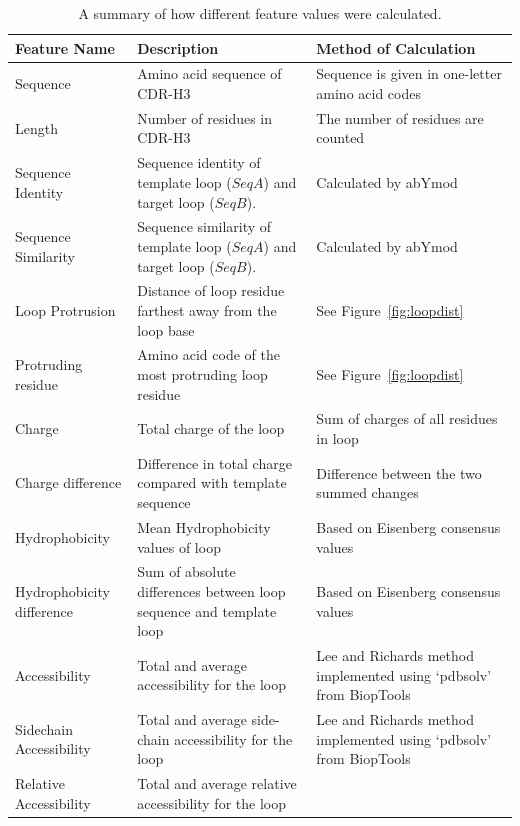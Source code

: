 \documentclass[12pt]{article}
\begin{document}
\begin{landscape}
\begin{longtable}{p{3cm}p{10cm}p{10cm}}
  \caption{A summary of how different feature values were calculated.}
  \label{tab:feature_table}\\ \hline
%
  \mbox{Feature} \mbox{Name}  %
  & Description %
  & Method of Calculation\\ \hline
%  
  Sequence %
  & Amino acid sequence of CDR-H3 %
  & Sequence is given in one-letter amino acid codes\\
%  
  Length %
  & Number of residues in CDR-H3 %
  & The number of residues are counted\\
%  
  \mbox{Sequence} \mbox{Identity} %
  & Sequence identity of template loop ($SeqA$) and target loop ($SeqB$). %
  & Calculated by abYmod\\
%  
  \mbox{Sequence} \mbox{Similarity} %
  & Sequence similarity of template loop ($SeqA$) and target loop ($SeqB$). %
  & Calculated by abYmod\\
%  
  \mbox{Loop} \mbox{Protrusion} %
  & Distance of loop residue farthest away from the loop base %
  & See Figure~\protect\ref{fig:loopdist}\\
%  
  \mbox{Protruding} \mbox{residue} %
  & Amino acid code of the most protruding loop residue %
  & See Figure~\protect\ref{fig:loopdist}\\
%  
  Charge %
  & Total charge of the loop %
  & Sum of charges of all residues in loop\\
%  
  \mbox{Charge} \mbox{difference} %
  & Difference in total charge compared with template sequence %
  & Difference between the two summed changes\\
%  
  Hydrophobicity %
  & Mean Hydrophobicity values of loop %
  & Based on Eisenberg consensus values\\
%  
  \mbox{Hydrophobicity} \mbox{difference} %
  & Sum of absolute differences between loop sequence and template loop %
  & Based on Eisenberg consensus values\\
%  
  Accessibility %
  & Total and average accessibility for the loop %
  & Lee and Richards method implemented using `pdbsolv' from BiopTools\\
%  
  \mbox{Sidechain} \mbox{Accessibility} %
  & Total and average side-chain accessibility for the loop %
  & Lee and Richards method implemented using `pdbsolv' from BiopTools\\
%  
  \mbox{Relative} \mbox{Accessibility}  %
  & Total and average relative accessibility for the loop %

\end{longtable}
\end{landscape}
\end{document}
